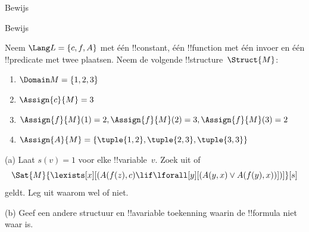\documentclass[../../../include/open-logic-section]{subfiles}
\begin{document}

\begin{prob}
  Bewijs 
\end{prob}
\tagendprob


\begin{prob}
  Bewijs 
\end{prob}
\tagendprob

\begin{prob}
Neem $\Lang L = \{c, f, A\}$ met één !!{constant}, één !!{function}
met één invoer en één !!{predicate} met twee plaatsen. Neem de volgende
!!{structure}~$\Struct{M}$:
\begin{enumerate}
\item $\Domain M = \{1, 2, 3\}$
\item $\Assign{c}{M} = 3$
\item $\Assign{f}{M}(1) = 2, \Assign{f}{M}(2) = 3, \Assign{f}{M}(3) = 2$
\item $\Assign{A}{M} = \{\tuple{1, 2}, \tuple{2, 3}, \tuple{3, 3}\}$
\end{enumerate}
(a) Laat $s(v) = 1$ voor elke !!{variable}~$v$. Zoek uit of
\[
\Sat{M}{\lexists[x][(A(f(z), c) \lif \lforall[y][(A(y, x) \lor A(f(y),
      x))])]}[s]
\]
geldt. Leg uit waarom wel of niet.

(b) Geef een andere structuur en !!a{variable} toekenning waarin de
!!{formula} niet waar is.
\end{prob}
\end{document}
